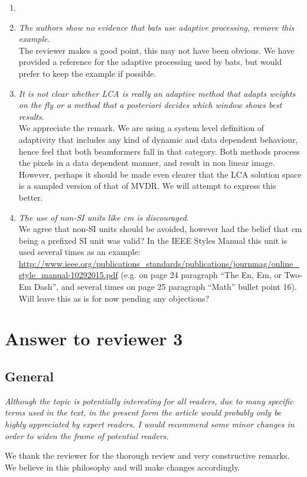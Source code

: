 \documentclass[11pt]{article} %
\newcommand\1{\vec 1}
\newcommand\q[1]{\textit{#1}}
\newcommand\qi[1]{\item\q{#1}}
\newcommand\hi[1]{\item[\textbf{#1}]}
\newcommand\ans[1]{#1}
\newcommand\ai[1]{\\[.5\baselineskip]\ans{#1}}
\begin{document}
\begin{enumerate}
\hi{Introduction}
\qi{The authors show no evidence that bats use adaptive processing, remove this example.}
\ai{The reviewer makes a good point, this may not have been obvious. We have provided a reference for the adaptive processing used by bats, but would prefer to keep the example if possible.}
%
\qi{It is not clear whether LCA is really an adaptive method that adapts weights on the fly or a method that a posteriori decides which window shows best results.}
\ai{We appreciate the remark. We are using a system level definition of adaptivity that includes any kind of dynamic and data dependent behaviour, hence feel that both beamformers fall in that category. Both methods process the pixels in a data dependent manner, and result in non linear image. However, perhaps it should be made even clearer that the LCA solution space is a sampled version of that of MVDR. We will attempt to express this better.}
%
\qi{The use of non-SI units like cm is discouraged.}
\ai{We agree that non-SI units should be avoided, however had the belief that cm being a prefixed SI unit was valid? In the IEEE Styles Manual this unit is used several times as an example: 
\url{http://www.ieee.org/publications_standards/publications/journmag/online_style_manual-10292015.pdf} (e.g. on page 24 paragraph ``The En, Em, or Two-Em Dash'', and several times on page 25 paragraph ``Math'' bullet point 16). Will leave this as is for now pending any objections?}
%
\end{enumerate}


\newpage
\section{Answer to reviewer 3}

\subsection*{General}

\q{Although the topic is potentially interesting for all readers, due to many specific terms used in the text, in the present form the article would probably only be highly appreciated by expert readers. I would recommend some minor changes in order to widen the frame of potential readers.}

\ans{We thank the reviewer for the thorough review and very constructive remarks. We believe in this philosophy and will make changes accordingly.}
\end{document}
